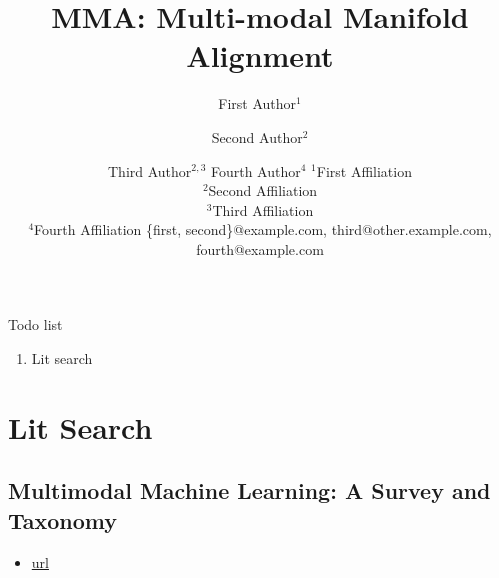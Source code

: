 \documentclass[11pt]{article}
\title{MMA: Multi-modal Manifold Alignment}
\author{
First Author$^1$
\and
Second Author$^2$\and
Third Author$^{2,3}$\And
Fourth Author$^4$
\affiliations
$^1$First Affiliation\\
$^2$Second Affiliation\\
$^3$Third Affiliation\\
$^4$Fourth Affiliation
\emails
\{first, second\}@example.com,
third@other.example.com,
fourth@example.com
}
\begin{document}
Todo list

\begin{enumerate}
    \item Lit search 
\end{enumerate}

\newpage

\maketitle
\setcounter{page}{1}


\begin{abstract}
    
\end{abstract}

\section{Lit Search}


\subsection{Multimodal Machine Learning: A Survey and Taxonomy}

\begin{itemize}
\item \href{https://ieeexplore.ieee.org/document/8269806}{url}
\end{itemize}
\end{document}
